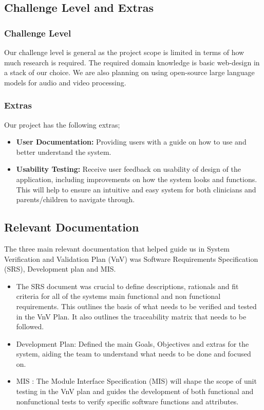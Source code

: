\documentclass[12pt, titlepage]{article}
\begin{document}
\subsection{Challenge Level and Extras}

\subsubsection{Challenge Level} 

Our challenge level is general as the project scope is limited in terms of how much
research is required. The required domain knowledge is basic web-design in a
stack of our choice. We are also planning on using open-source large language
models for audio and video processing.

\subsubsection{Extras}
Our project has the following extras;
\begin{itemize}
  \item \textbf{User Documentation: } Providing users with a guide on how to use and
  better understand the system. 
  \item \textbf{Usability Testing: } Receive user feedback on usability of design of the application, 
including improvements on how the system looks and functions. This will help to ensure an 
intuitive and easy system for both clinicians and parents/children to navigate through.
\end{itemize}


\subsection{Relevant Documentation}

  The three main relevant documentation that helped guide us in System Verification and Validation Plan (VnV) was Software Requirements Specification
  (SRS), Development plan and MIS.  
  
  \begin{itemize}
    \item The SRS document was crucial to define descriptions, rationals and fit criteria for all of the systems main functional 
    and non functional requirements. This outlines the basis of what needs to be verified and tested in the VnV Plan. It also outlines the 
    traceability matrix that needs to be followed.
    \item Development Plan: Defined the main Goals, Objectives and extras for the system, aiding the team to understand what
     needs to be done and focused on. 
    \item MIS : The Module Interface Specification (MIS) will shape the scope of unit testing in the VnV plan and guides 
    the development of both functional and nonfunctional tests to verify specific software functions and attributes.
  \end{itemize}
\end{document}
